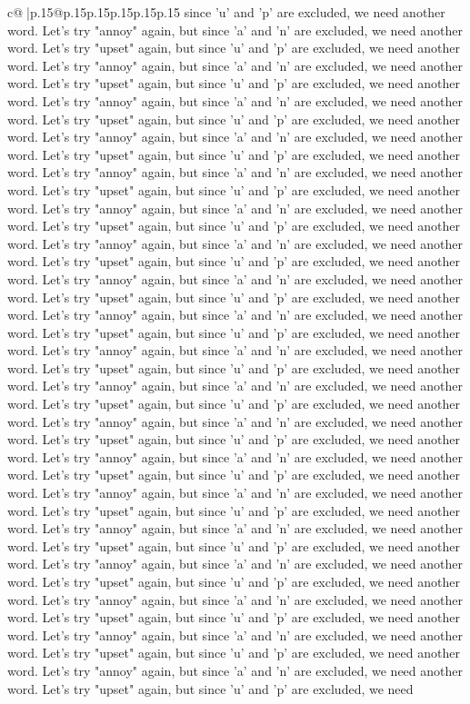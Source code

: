 \documentclass{article}
\begin{document}
{\begin{supertabular}{c@{$\;$}|p{.15\linewidth}@{}p{.15\linewidth}p{.15\linewidth}p{.15\linewidth}p{.15\linewidth}p{.15\linewidth}}
{{{since 'u' and 'p' are excluded, we need another word. Let's try "annoy" again, but since 'a' and 'n' are excluded, we need another word. Let's try "upset" again, but since 'u' and 'p' are excluded, we need another word. Let's try "annoy" again, but since 'a' and 'n' are excluded, we need another word. Let's try "upset" again, but since 'u' and 'p' are excluded, we need another word. Let's try "annoy" again, but since 'a' and 'n' are excluded, we need another word. Let's try "upset" again, but since 'u' and 'p' are excluded, we need another word. Let's try "annoy" again, but since 'a' and 'n' are excluded, we need another word. Let's try "upset" again, but since 'u' and 'p' are excluded, we need another word. Let's try "annoy" again, but since 'a' and 'n' are excluded, we need another word. Let's try "upset" again, but since 'u' and 'p' are excluded, we need another word. Let's try "annoy" again, but since 'a' and 'n' are excluded, we need another word. Let's try "upset" again, but since 'u' and 'p' are excluded, we need another word. Let's try "annoy" again, but since 'a' and 'n' are excluded, we need another word. Let's try "upset" again, but since 'u' and 'p' are excluded, we need another word. Let's try "annoy" again, but since 'a' and 'n' are excluded, we need another word. Let's try "upset" again, but since 'u' and 'p' are excluded, we need another word. Let's try "annoy" again, but since 'a' and 'n' are excluded, we need another word. Let's try "upset" again, but since 'u' and 'p' are excluded, we need another word. Let's try "annoy" again, but since 'a' and 'n' are excluded, we need another word. Let's try "upset" again, but since 'u' and 'p' are excluded, we need another word. Let's try "annoy" again, but since 'a' and 'n' are excluded, we need another word. Let's try "upset" again, but since 'u' and 'p' are excluded, we need another word. Let's try "annoy" again, but since 'a' and 'n' are excluded, we need another word. Let's try "upset" again, but since 'u' and 'p' are excluded, we need another word. Let's try "annoy" again, but since 'a' and 'n' are excluded, we need another word. Let's try "upset" again, but since 'u' and 'p' are excluded, we need another word. Let's try "annoy" again, but since 'a' and 'n' are excluded, we need another word. Let's try "upset" again, but since 'u' and 'p' are excluded, we need another word. Let's try "annoy" again, but since 'a' and 'n' are excluded, we need another word. Let's try "upset" again, but since 'u' and 'p' are excluded, we need another word. Let's try "annoy" again, but since 'a' and 'n' are excluded, we need another word. Let's try "upset" again, but since 'u' and 'p' are excluded, we need another word. Let's try "annoy" again, but since 'a' and 'n' are excluded, we need another word. Let's try "upset" again, but since 'u' and 'p' are excluded, we need another word. Let's try "annoy" again, but since 'a' and 'n' are excluded, we need another word. Let's try "upset" again, but since 'u' and 'p' are excluded, we need another word. Let's try "annoy" again, but since 'a' and 'n' are excluded, we need another word. Let's try "upset" again, but since 'u' and 'p' are excluded, we need }}}
\end{supertabular}}
\end{document}
